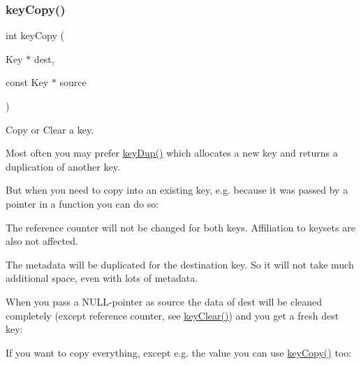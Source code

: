 \subsubsection{\texorpdfstring{keyCopy()}{keyCopy()}}
{\footnotesize\ttfamily int key\+Copy (\begin{DoxyParamCaption}\item[{Key $\ast$}]{dest,  }\item[{const Key $\ast$}]{source }\end{DoxyParamCaption})}



Copy or Clear a key. 

Most often you may prefer \mbox{\hyperlink{group__key_gae6ec6a60cc4b8c1463fa08623d056ce3}{key\+Dup()}} which allocates a new key and returns a duplication of another key.

But when you need to copy into an existing key, e.\+g. because it was passed by a pointer in a function you can do so\+:


\begin{DoxyCodeInclude}{0}
\DoxyCodeLine{\{}
\DoxyCodeLine{        \textcolor{comment}{// receive key c}}
\DoxyCodeLine{        \textcolor{comment}{// the caller will see the changed key k}}
\DoxyCodeLine{\}}
\end{DoxyCodeInclude}
 The reference counter will not be changed for both keys. Affiliation to keysets are also not affected.

The metadata will be duplicated for the destination key. So it will not take much additional space, even with lots of metadata.

When you pass a N\+U\+L\+L-\/pointer as source the data of dest will be cleaned completely (except reference counter, see \mbox{\hyperlink{group__key_gab2242311a36bbc0520e0d36895107ec1}{key\+Clear()}}) and you get a fresh dest key\+:


\begin{DoxyCodeInclude}{0}
\DoxyCodeLine{\{}
\DoxyCodeLine{        \textcolor{comment}{// k is now an empty and fresh key}}
\DoxyCodeLine{\}}
\end{DoxyCodeInclude}
 If you want to copy everything, except e.\+g. the value you can use \mbox{\hyperlink{group__key_ga6a12cbbe656a1ad9f41b8c681d7a2f92}{key\+Copy()}} too\+:


